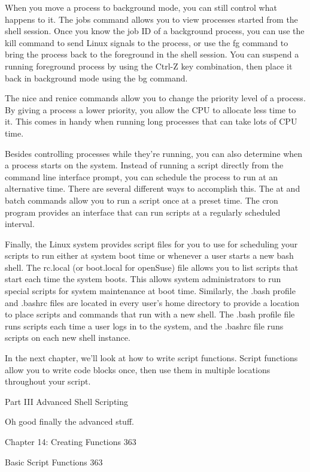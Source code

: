 When you move a process to background mode, you can still control what happens to it. The jobs command allows you to view processes started from the shell session. Once you know the job ID of a background process, you can use the kill command to send Linux signals to the process, or use the fg command to bring the process back to the foreground in the shell session. You can suspend a running foreground process by using the Ctrl-Z key combination, then place it back in background mode using the bg command.

The nice and renice commands allow you to change the priority level of a process. By giving a process a lower priority, you allow the CPU to allocate less time to it. This comes in handy when running long processes that can take lots of CPU time.

Besides controlling processes while they're running, you can also determine when a process starts on the system. Instead of running a script directly from the command line interface prompt, you can schedule the process to run at an alternative time. There are several different ways to accomplish this. The at and batch commands allow you to run a script once at a preset time. The cron program provides an interface that can run scripts at a regularly scheduled interval.

Finally, the Linux system provides script files for you to use for scheduling your scripts to run either at system boot time or whenever a user starts a new bash shell. The rc.local (or boot.local for openSuse) file allows you to list scripts that start each time the system boots. This allows system administrators to run special scripts for system maintenance at boot time. Similarly, the .bash profile and .bashrc files are located in every user's home directory to provide a location to place scripts and commands that run with a new shell. The .bash profile file runs scripts each time a user logs in to the system, and the .bashrc file runs scripts on each new shell instance.

In the next chapter, we'll look at how to write script functions. Script functions allow you to write code blocks once, then use them in multiple locations throughout your script.

Part III Advanced Shell Scripting

Oh good finally the advanced stuff.

Chapter 14: Creating Functions 363



Basic Script Functions 363



